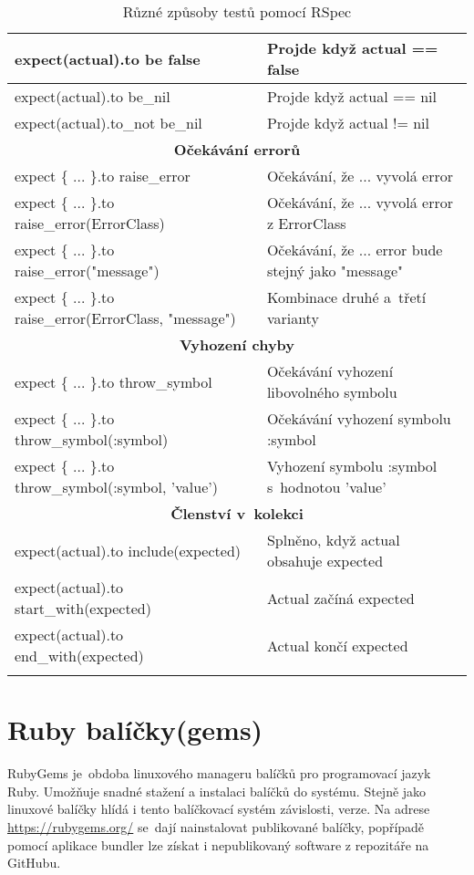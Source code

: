 \begin{center}
\begin{longtable}{| m{} | m{} |}
 \hline
 expect(actual).to be false   & Projde když actual == false \\
 \hline
 expect(actual).to be\_nil     & Projde když actual == nil \\
 \hline
 expect(actual).to\_not be\_nil & Projde když actual != nil \\
 \hline
 \multicolumn{2}{||c||}{\textbf{Očekávání errorů}}\\
 \hline
 expect \{ ... \}.to raise\_error & Očekávání, že ... vyvolá error \\
 \hline
 expect \{ ... \}.to raise\_error(ErrorClass) & Očekávání, že ... vyvolá error z ErrorClass\\
 \hline
 expect \{ ... \}.to raise\_error("message") & Očekávání, že ... error bude stejný jako "message" \\
 \hline
 expect \{ ... \}.to raise\_error(ErrorClass, "message")  & Kombinace druhé a~třetí varianty \\
 \hline
 \multicolumn{2}{||c||}{\textbf{Vyhození chyby}}\\
 \hline
 expect \{ ... \}.to throw\_symbol & Očekávání vyhození libovolného symbolu\\ 
 \hline
 expect \{ ... \}.to throw\_symbol(:symbol) & Očekávání vyhození symbolu :symbol\\ 
 \hline
 expect \{ ... \}.to throw\_symbol(:symbol, 'value') & Vyhození symbolu :symbol s~hodnotou 'value'\\ 
 \hline
 \multicolumn{2}{||c||}{\textbf{Členství v~kolekci}}\\
 \hline
 expect(actual).to include(expected) & Splněno, když actual obsahuje expected \\
 \hline
 expect(actual).to start\_with(expected) & Actual začíná expected \\
 \hline
 expect(actual).to end\_with(expected) & Actual končí expected \\
 \hline
 \caption[RSpec metody testování]{Různé způsoby testů pomocí RSpec}\label{tab:rspec}
\end{longtable}
\end{center}

\section{Ruby balíčky(gems)}
\par RubyGems\cite{elmendorfdirk2006} je~obdoba linuxového manageru balíčků pro programovací jazyk Ruby. Umožňuje snadné stažení a instalaci balíčků do systému. Stejně jako linuxové balíčky hlídá i tento balíčkovací systém závislosti, verze. Na adrese \url{https://rubygems.org/} se~dají nainstalovat publikované balíčky, popřípadě pomocí aplikace bundler lze získat i nepublikovaný software z repozitáře na GitHubu. 